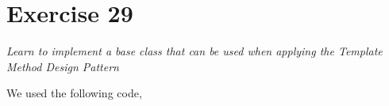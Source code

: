 \documentclass[12pt]{article}
\newcommand{\desc}[1]{\textit{#1} \vspace{1em}}
\begin{document}
\clearpage

\section*{Exercise 29}
\desc{Learn to implement a base class that can be used when applying the Template Method Design Pattern}

We used the following code,







\clearpage
\end{document}

